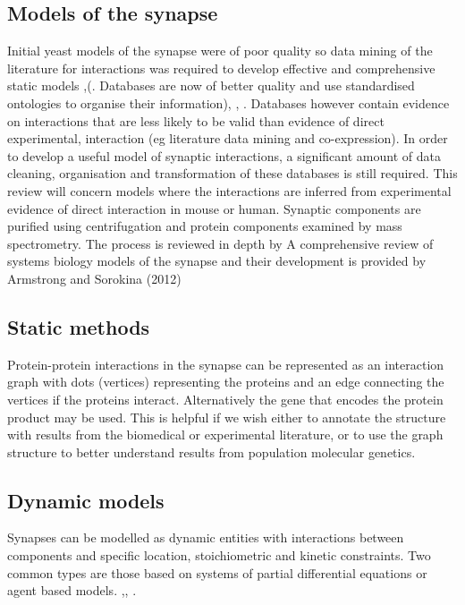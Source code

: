 \subsection{Models of the synapse}

Initial yeast models of the synapse were of poor quality so data mining of the literature for interactions was required to develop effective and comprehensive static models \cite{pocklington2006proteomes},\cite{armstrong2012evolution}(. Databases are now of better quality and use standardised ontologies to organise their information)\cite{brazma2006standards}, \cite{hermjakob2004hupo}, \cite{kerrien2007broadening}. Databases however contain evidence on interactions that are less likely to be valid than evidence of direct experimental, interaction (eg literature data mining and co-expression). In order to develop a useful model of synaptic interactions, a significant amount of data cleaning, organisation and transformation of these databases is still required. This review will concern models where the interactions are inferred from experimental evidence of direct interaction in mouse or human. Synaptic components are purified using centrifugation and protein components examined by mass spectrometry. The process is reviewed in depth by \cite{lassek2014proteome} A comprehensive review of systems biology models of the synapse and their development is provided by Armstrong and Sorokina (2012) \cite{armstrong2012evolution}

\subsection{Static methods}

Protein-protein interactions in the synapse can be represented as an interaction graph with dots (vertices) representing the proteins and an edge connecting the vertices if the proteins interact. Alternatively the gene that encodes the protein product may be used. This is helpful if we wish either to annotate the structure with results from the biomedical or experimental literature, or to use the graph structure to better understand results from population molecular genetics. 

\subsection{Dynamic models}

Synapses can be modelled as dynamic entities with interactions between components and specific location, stoichiometric and kinetic constraints. Two common types are those based on systems of partial differential equations or agent based models. \cite{sorokina2013simulator},\cite{sorokin2014rkappa}, \cite{walpole2013multiscale}.

